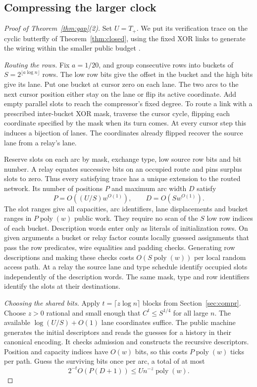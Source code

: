 \subsection{Compressing the larger clock}
\begin{proof}[Proof of Theorem~\ref{thm:gap}(2)]
Set $U=T_+$. We put its verification trace on the cyclic butterfly
of Theorem~\ref{thm:closed}, using the fixed XOR links to generate the
wiring within the smaller public budget \cite[Section~]{oaG}.

\emph{Routing the rows.}
Fix $a=1/20$, and group consecutive rows into buckets of
$S=2^{\lfloor a\log n\rfloor}$ rows. The low row bits give the offset
in the bucket and the high bits give its lane. Put one bucket at
cursor zero on each lane. The two arcs to the next cursor position
either stay on the lane or flip its active coordinate. Add empty
parallel slots to reach the compressor's fixed degree. To route a
link with a prescribed inter-bucket XOR mask, traverse the cursor
cycle, flipping each coordinate
specified by the mask when its turn comes. At every cursor step
this induces a bijection of lanes. The coordinates already flipped
recover the source lane from a relay's lane.

Reserve slots on each arc by mask, exchange type, low source row
bits and bit number. A relay equates successive bits on an occupied
route and pins surplus slots to zero. Thus every satisfying trace
has a unique extension to the routed network. Its number of positions
$P$ and maximum arc width $D$ satisfy
\[
              P=O((U/S)w^{O(1)}),\qquad D=O(Sw^{O(1)}).
\]
The slot ranges give all capacities, arc identifiers, lane displacements
and bucket ranges in $P\operatorname{poly}(w)$ public work. They
require no scan of the $S$ low row indices of each bucket.
Description words enter only as literals of initialization rows. On
given arguments a bucket or relay factor counts locally guessed
assignments that pass the row predicates, wire equalities and padding
checks. Generating row descriptions and making these checks costs
$O(S\operatorname{poly}(w))$ per local random access path. At a relay
the source lane and type schedule identify occupied slots independently
of the description words. The same mask, type and row identifiers
identify the slots at their destinations.

\emph{Choosing the shared bits.}
Apply $t=\lceil z\log n\rceil$ blocks from Section~\ref{sec:compr}.
Choose $z>0$ rational and small enough that $C^t\le S^{1/4}$ for all
large $n$. The available $\log(U/S)+O(1)$ lane coordinates suffice.
The public machine generates the initial descriptors and reads the
guesses for a history in their canonical encoding. It checks admission
and constructs the recursive descriptors. Position and capacity
indices have $O(w)$ bits, so this costs $P\operatorname{poly}(w)$ ticks
per path. Guess the surviving bits once per arc, a total of at most
\[
              2^{-t}O(P(D+1))\le U n^{-z}\operatorname{poly}(w).
\]


\end{proof}
